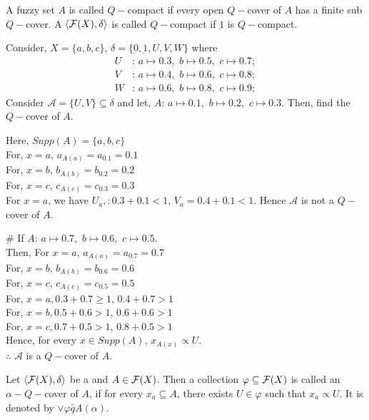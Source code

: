 \documentclass[../main-sheet.tex]{subfiles}
\begin{document}
\begin{defn}[\(Q-\)compact]
    A fuzzy set \(A \) is called \(Q-\)compact if every open \(Q-\)cover of \(A \) has a finite sub \(Q-\)cover. A \fts\s \(\langle \mathcal{F}(X), \delta \rangle\) is called \(Q-\)compact if \(\underbar{1}\) is \(Q-\)compact.
\end{defn}
\begin{ex}
    Consider, \(X=\{a,b,c \}\), \(\delta=\{\underbar{0},\underbar{1}, U,V,W \}\) where 
    \begin{align*}
        U&:\,a\mapsto 0.3,\,\,b\mapsto 0.5,\,\,c\mapsto0.7;\\
        V&:\,a\mapsto 0.4,\,\,b\mapsto 0.6,\,\,c\mapsto0.8;\\
        W&:\,a\mapsto 0.6,\,\,b\mapsto 0.8,\,\,c\mapsto0.9;
    \end{align*}
    Consider \(\mathcal{A }=\{U,V \}\subseteq \delta\) and let, \(A:\,a\mapsto 0.1,\,\,b\mapsto 0.2,\,\,c\mapsto0.3\). Then, find the \(Q-\)cover of \(A \).
\end{ex}
\begin{soln}
    Here, \(Supp(A)=\{a,b,c \}\)\\
    For, \(x=a\), \(a_{A(a)}=a_{0.1}=0.1\)\\
    For, \(x=b\), \(b_{A(b)}=b_{0.2}=0.2\)\\
    For, \(x=c\), \(c_{A(c)}=c_{0.3}=0.3\)\\
    For \(x=a \), we have \(U_a,:0.3+0.1<1 \), \(V_a=0.4+0.1<1\). Hence \(\mathcal{A }\) is not a \(Q-\)cover of \(A \).
\end{soln}
\# If \(A:\,a\mapsto 0.7,\,\,b\mapsto 0.6,\,\,c\mapsto0.5\).\\
Then, For \(x=a\), \(a_{A(a)}=a_{0.7}=0.7\)\\
For, \(x=b\), \(b_{A(b)}=b_{0.6}=0.6\)\\
For, \(x=c\), \(c_{A(c)}=c_{0.5}=0.5\)\\
For, \(x=a, 0.3+0.7\geq1\), \(0.4+0.7>1\)\\
For, \(x=b, 0.5+0.6> 1\), \(0.6+0.6>1\)\\
For, \(x=c, 0.7+0.5>1\), \(0.8+0.5>1\)\\
Hence, for every \(x\in Supp(A )\), \(x_{A(x )}\propto U \).\\
\(\therefore \) \(\mathcal{A }\) is a \(Q-\)cover of \(A \).
\begin{defn}
    Let \(\langle \mathcal{F}(X), \delta \rangle \) be a \fts\s and \(A\in \mathcal{F}(X) \). Then a collection \(\varphi\subseteq \mathcal{F}(X)\) is called an \(\alpha-Q-\)cover of \(A \), if for every \(x_a\subseteq A \), there exists \(U\in \varphi \) such that \(x_a\propto U \). It is denoted by \(\vee \varphi \hat{q }A(\alpha)\).
\end{defn}
\end{document}
